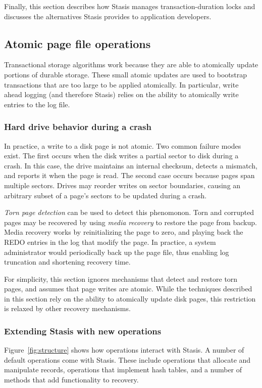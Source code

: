 \documentclass[letterpaper,twocolumn,10pt]{article}
\newcommand{\yad}{Stasis\xspace}
\begin{document}
Finally, this section describes how \yad manages transaction-duration
locks and discusses the alternatives \yad provides to application developers.

\subsection{Atomic page file operations}

Transactional storage algorithms work because they are able to
atomically update portions of durable storage.  These small atomic
updates are used to bootstrap transactions that are too large to be
applied atomically.  In particular, write ahead logging (and therefore
\yad) relies on the ability to atomically write entries to the log
file.

\subsubsection{Hard drive behavior during a crash}
In practice, a write to a disk page is not atomic.  Two common failure
modes exist.  The first occurs when the disk writes a partial sector
to disk during a crash.  In this case, the drive maintains an internal
checksum, detects a mismatch, and reports it when the page is read.
The second case occurs because pages span multiple sectors.  Drives
may reorder writes on sector boundaries, causing an arbitrary subset
of a page's sectors to be updated during a crash.  

{\em Torn page detection} can be used to detect this phenomonon.  Torn
and corrupted pages may be recovered by using {\em media recovery} to
restore the page from backup.  Media recovery works by reinitializing
the page to zero, and playing back the REDO entries in the log that
modify the page.  In practice, a system administrator would
periodically back up the page file, thus enabling log truncation and
shortening recovery time.

For simplicity, this section ignores mechanisms that detect
and restore torn pages, and assumes that page writes are atomic.
While the techniques described in this section rely on the ability to
atomically update disk pages, this restriction is relaxed by other 
recovery mechanisms.


\subsubsection{Extending \yad with new operations}

Figure~\ref{fig:structure} shows how operations interact with \yad.  A
number of default operations come with \yad.  These include operations
that allocate and manipulate records, operations that implement hash
tables, and a number of methods that add functionality to recovery.
\end{document}

